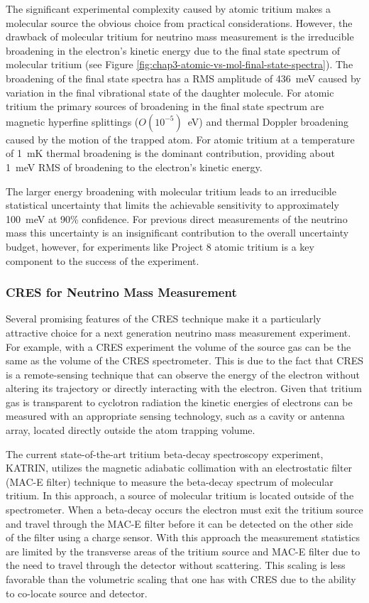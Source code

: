 The significant experimental complexity caused by atomic tritium makes a molecular source the obvious choice from practical considerations. However, the drawback of molecular tritium for neutrino mass measurement is the irreducible broadening in the electron's kinetic energy due to the final state spectrum of molecular tritium (see Figure \ref{fig:chap3-atomic-vs-mol-final-state-spectra}). The broadening of the final state spectra has a RMS amplitude of 436~meV caused by variation in the final vibrational state of the daughter molecule. For atomic tritium the primary sources of broadening in the final state spectrum are magnetic hyperfine splittings ($O(10^{-5})$~eV) and thermal Doppler broadening caused by the motion of the trapped atom. For atomic tritium at a temperature of 1~mK thermal broadening is the dominant contribution, providing about 1~meV RMS of broadening to the electron's kinetic energy.

The larger energy broadening with molecular tritium leads to an irreducible statistical uncertainty that limits the achievable sensitivity to approximately 100~meV at 90\% confidence. For previous direct measurements of the neutrino mass this uncertainty is an insignificant contribution to the overall uncertainty budget, however, for experiments like Project 8 atomic tritium is a key component to the success of the experiment.

\subsubsection*{CRES for Neutrino Mass Measurement}

Several promising features of the CRES technique make it a particularly attractive choice for a next generation neutrino mass measurement experiment. For example, with a CRES experiment the volume of the source gas can be the same as the volume of the CRES spectrometer. This is due to the fact that CRES is a remote-sensing technique that can observe the energy of the electron without altering its trajectory or directly interacting with the electron. Given that tritium gas is transparent to cyclotron radiation the kinetic energies of electrons can be measured with an appropriate sensing technology, such as a cavity or antenna array, located directly outside the atom trapping volume. 

The current state-of-the-art tritium beta-decay spectroscopy experiment, KATRIN, utilizes the magnetic adiabatic collimation with an electrostatic filter (MAC-E filter) technique to measure the beta-decay spectrum of molecular tritium. In this approach, a source of molecular tritium is located outside of the spectrometer. When a beta-decay occurs the electron must exit the tritium source and travel through the MAC-E filter before it can be detected on the other side of the filter using a charge sensor. With this approach the measurement statistics are limited by the transverse areas of the tritium source and MAC-E filter due to the need to travel through the detector without scattering. This scaling is less favorable than the volumetric scaling that one has with CRES due to the ability to co-locate source and detector.


